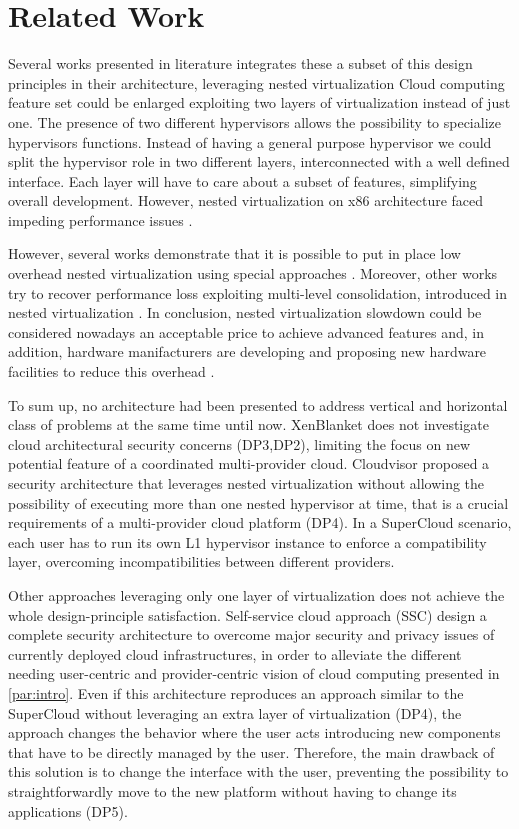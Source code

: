\documentclass{sig-alternate}
\begin{document}
\section{Related Work}
Several works presented in literature integrates these a subset of this design principles in their architecture, leveraging nested virtualization \cite{turtle:ibm,art:blan, cloudvisor:zhang}
Cloud computing feature set could be enlarged exploiting two layers of virtualization instead of just one. The presence of two different hypervisors allows the possibility to specialize hypervisors functions. Instead of having a general purpose hypervisor we could split the hypervisor role in two different layers, interconnected with a well defined interface.
Each layer will have to care about a subset of features, simplifying overall development.
However, nested virtualization on x86 architecture faced impeding performance issues \cite{rec:virt}.

However, several works demonstrate that it is possible to put in place low overhead nested virtualization using special approaches \cite{turtle:ibm} . Moreover, other works try to recover performance loss exploiting multi-level consolidation, introduced in nested virtualization \cite{art:blan}. In conclusion, nested virtualization slowdown could be considered nowadays an acceptable price to achieve advanced features and, in addition, hardware manifacturers are developing and proposing new hardware facilities to reduce this overhead \cite{vmcs:nakajima}.

To sum up, no architecture had been presented to address vertical and horizontal class of problems at the same time until now. XenBlanket does not investigate cloud architectural security concerns (DP3,DP2), limiting the focus on new potential feature of a coordinated multi-provider cloud. Cloudvisor proposed a security architecture that leverages nested virtualization without allowing the possibility of executing more than one nested hypervisor at time, that is a crucial requirements of a multi-provider cloud platform (DP4). In a SuperCloud scenario, each user has to run its own L1 hypervisor instance to enforce a compatibility layer, overcoming incompatibilities between different providers.

Other approaches leveraging only one layer of virtualization does not achieve the whole design-principle satisfaction. Self-service cloud approach (SSC) \cite{ssc:art} design a complete security architecture to overcome major security and privacy issues of currently deployed cloud infrastructures, in order to alleviate the different needing user-centric and provider-centric vision of cloud computing presented in \ref{par:intro}. Even if this architecture reproduces an approach similar to the SuperCloud without leveraging an extra layer of virtualization (DP4), the approach changes the behavior where the user acts introducing new components that have to be directly managed by the user. Therefore, the main drawback of this solution is to change the interface with the user, preventing the possibility to straightforwardly move to the new platform without having to change its applications (DP5).
\end{document}

